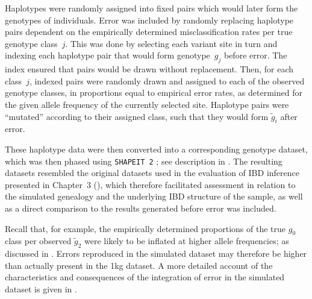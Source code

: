 Haplotypes were randomly assigned into fixed pairs which would later form the genotypes of individuals.
Error was included by randomly replacing haplotype pairs dependent on the empirically determined misclassification rates per true genotype class~$j$.
This was done by selecting each variant site in turn and indexing each haplotype pair that would form genotype~$g_j$ before error.
The index ensured that pairs would be drawn without replacement.
Then, for each class~$j$, indexed pairs were randomly drawn and assigned to each of the  observed genotype classes, in proportions equal to empirical error rates, as determined for the given allele frequency of the currently selected site.
Haplotype pairs were ``mutated'' according to their assigned class, such that they would form $\tilde{g}_i$ after error.

These haplotype data were then converted into a corresponding genotype dataset, which was then phased using \texttt{SHAPEIT\,2} \citep{Delaneau:2008dk,Delaneau:2013hi}; see description in .
The  resulting datasets resembled the original datasets used in the evaluation of IBD inference presented in Chapter~3 (), which therefore facilitated assessment in relation to the simulated genealogy and the underlying IBD structure of the sample, as well as a direct comparison to the results generated before error was included.


Recall that, for example, the empirically determined proportions of the true $g_0$ class per observed $\tilde{g}_2$ were likely to be inflated at higher allele frequencies; as discussed in .
Errors reproduced in the simulated dataset may therefore be higher than actually present in the \gls{1kg} dataset.
A more detailed account of the characteristics and consequences of the integration of error in the simulated dataset is given in .


